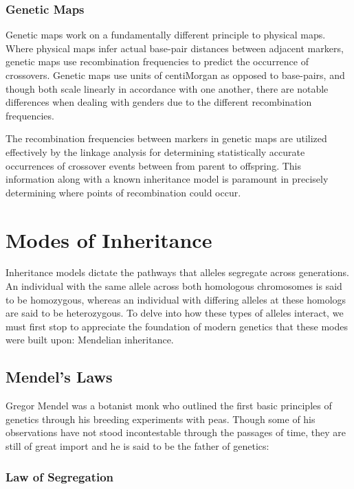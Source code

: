 \subsubsection{Genetic Maps}

Genetic maps work on a fundamentally different principle to physical maps. Where physical maps infer actual base-pair distances between adjacent markers, genetic maps use recombination frequencies to predict the occurrence of crossovers. Genetic maps use units of centiMorgan as opposed to base-pairs, and though both scale linearly in accordance with one another, there are notable differences when dealing with genders due to the different recombination frequencies. 

The recombination frequencies between markers in genetic maps are utilized effectively by the linkage analysis for determining statistically accurate occurrences of crossover events between from parent to offspring. This information along with a known inheritance model is paramount in precisely determining where points of recombination could occur.


\section{Modes of Inheritance}

Inheritance models dictate the pathways that alleles segregate across generations.  An individual with the same allele across both homologous chromosomes is said to be \gls{homozygous}, whereas an individual with differing alleles at these homologs are said to be \gls{heterozygous}. To delve into how these types of alleles interact, we must first stop to appreciate the foundation of modern genetics that these modes were built upon: Mendelian inheritance.

\subsection{Mendel's Laws}

Gregor Mendel was a botanist monk who outlined the first basic principles of genetics through his breeding experiments with peas. Though some of his observations have not stood incontestable through the passages of time, they are still of great import and he is said to be the father of genetics:

\subsubsection{Law of Segregation}

